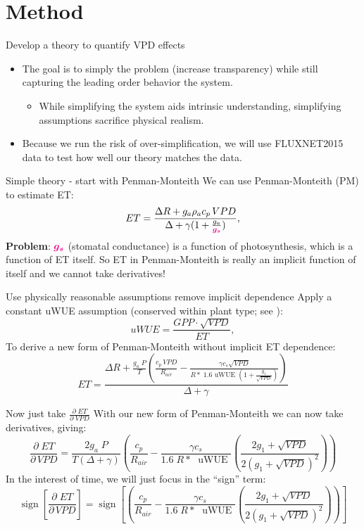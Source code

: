 \documentclass[aspectratio=169]{beamer}
\DeclareMathOperator{\sign}{sign}
\begin{document}
\section{Method}
\begin{frame}{Develop a theory to quantify VPD effects}
  \begin{itemize}
  \item The goal is to simply the problem (increase transparency) while still capturing the leading order behavior the system.
    \begin{itemize}
    \item While simplifying the system aids intrinsic understanding, simplifying assumptions sacrifice physical realism.
    \end{itemize}
  \item Because we run the risk of over-simplification, we will use FLUXNET2015 data to test how well our theory matches the data. 
  \end{itemize}
\end{frame}

\begin{frame}{Simple theory - start with Penman-Monteith}
  We can use Penman-Monteith (PM) to estimate ET:
  \[ET = \frac{\Delta R + g_a \rho_a c_p \, VPD}{\Delta + \gamma(1 + \frac{g_a}{\textcolor{magenta}{\boldsymbol{g_s}}})},\]
    \textbf{Problem}: \Large $\textcolor{magenta}{\boldsymbol{g_s}}$ \normalsize (stomatal conductance) is a function of photosynthesis, which is a function of ET itself.  So ET in Penman-Monteith is really an implicit function of itself and we cannot take derivatives!
\end{frame}

\begin{frame}{Use physically reasonable assumptions remove implicit dependence}
  Apply a constant uWUE assumption (conserved within plant type; see \cite{Zhou_2016}):
  \[uWUE = \frac{GPP \cdot \sqrt{VPD}}{ET},\]
  To derive a new form of Penman-Monteith without implicit ET dependence:
  \[  ET = \frac{\Delta R + \frac{g_a\; P}{T} \left( \frac{ c_p \, VPD}{R_{air}} -  \frac{\gamma c_s \sqrt{VPD} }{ R* \; 1.6 \text{ uWUE } (1 + \frac{g_1}{\sqrt{VPD}})} \right)}{ \Delta + \gamma}\]
\end{frame}

\begin{frame}{Now just take $\frac{\partial \; ET}{\partial \; VPD}$}
  With our new form of Penman-Monteith we can now take derivatives, giving:
  \[\frac{\partial \;  ET}{\partial \, VPD} = \frac{2 g_a \; P}{T(\Delta + \gamma)}   \left(\frac{ c_p}{R_{air}} - \frac{\gamma c_s }{1.6 \; R*\; \text{ uWUE }} \left( \frac{2 g_1 + \sqrt{VPD}}{2 (g_1 + \sqrt{VPD})^2}\right) \right)\]
  In the interest of time, we will just focus in the ``sign'' term:
  \[\sign \left[\frac{\partial \;  ET}{\partial \, VPD}\right] = \sign \left[  \left(\frac{ c_p}{R_{air}} - \frac{\gamma c_s }{1.6 \; R*\; \text{ uWUE }} \left( \frac{2 g_1 + \sqrt{VPD}}{2 (g_1 + \sqrt{VPD})^2}\right) \right) \right] \]

\end{frame}
\end{document}

